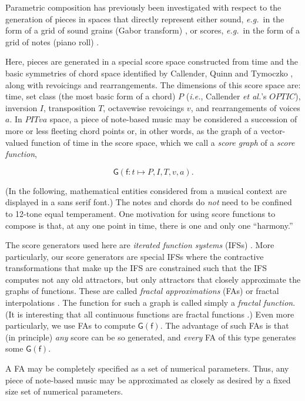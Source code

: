 \documentclass[english,11pt,letterpaper,onecolumn]{scrartcl}
\numberwithin{equation}{section}
\begin{document}
Parametric composition has previously been investigated with respect to the
generation of pieces in spaces that directly represent either sound,
\textit{e.g.}\ in the form of a grid of sound grains (Gabor transform)
\cite{obsessed}, or scores, \textit{e.g.}\ in the form of a grid of notes (piano
roll) \cite{ifsmusic}.

Here, pieces are generated in a special score space constructed from time and
the basic symmetries of chord space identified by Callender, Quinn and Tymoczko
\cite{callender:346}, along with revoicings and rearrangements. The dimensions
of this score space are: time, set class (the most basic form of a  chord) $P$
(\textit{i.e.}, Callender \textit{et al.}'s $OPTIC$), inversion $I$,
transposition $T$, octavewise revoicings $v$, and rearrangements of voices $a$.
In $PITva$ space, a piece of note-based music may be considered a succession of
more or less fleeting chord points or, in other words, as the graph of a
vector-valued function of time in the score space, which we call a \textit{score
graph} of a \textit{score function},

$$\mathsf{G}(\mathsf{f}: t \mapsto P, I, T, v, a).$$

\noindent (In the following, mathematical entities considered from a musical
context  are displayed in a \textsf{sans serif} font.) The notes and chords do
\textit{not} need to be confined to 12-tone equal temperament. One motivation
for using score functions to compose is that, at any one point in time, there is
one and only one ``harmony.''

The score generators used here are \textit{iterated function systems} (IFSs)
\cite{barnsley1985iterated, 10.2307/24893080, fractalseverywhere}. More
particularly, our score generators are special IFSs where the contractive
transformations that make up the IFS are constrained such that the IFS computes
not any old attractors, but only attractors that closely approximate the graphs
of functions. These are called \textit{fractal approximations} (FAs) or fractal
interpolations \cite{Barnsley1986, fractalseverywhere, navascues2014fractal}.
The function for such a graph is called simply a \textit{fractal function}. (It
is interesting that all continuous functions are fractal functions
\cite{2016arXiv161001369B}.) Even more particularly, we use FAs to compute
$\mathsf{G(f)}$. The advantage of such FAs is that (in principle) \textit{any}
score can be so generated, and \textit{every} FA of this type generates some
$\mathsf{G(f)}$.

A FA may be completely specified as a set of numerical parameters. Thus, any
piece of note-based music may be approximated as closely as desired by a fixed
size set of numerical parameters.
\end{document}
